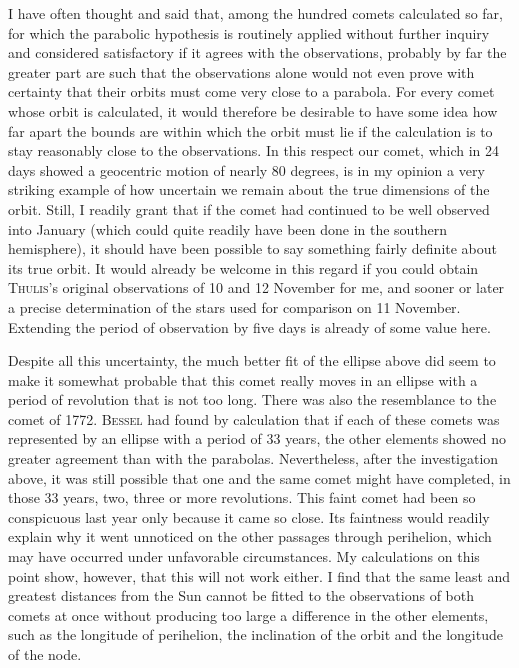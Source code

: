 \par\indent I have often thought and said that, among the hundred comets calculated so far, for which the parabolic hypothesis is routinely applied without further inquiry and considered satisfactory if it agrees with the observations, probably by far the greater part are such that the observations alone would not even prove with certainty that their orbits must come very close to a parabola. For every comet whose orbit is calculated, it would therefore be desirable to have some idea how far apart the bounds are within which the orbit must lie if the calculation is to stay reasonably close to the observations. In this respect our comet, which in 24 days showed a geocentric motion of nearly 80 degrees, is in my opinion a very striking example of how uncertain we remain about the true dimensions of the orbit. Still, I readily grant that if the comet had continued to be well observed into January (which could quite readily have been done in the southern hemisphere), it should have been possible to say something fairly definite about its true orbit. It would already be welcome in this regard if you could obtain \textsc{Thulis}’s original observations of 10 and 12 November for me, and sooner or later a precise determination of the stars used for comparison on 11 November. Extending the period of observation by five days is already of some value here.

\par\indent Despite all this uncertainty, the much better fit of the ellipse above did seem to make it somewhat probable that this comet really moves in an ellipse with a period of revolution that is not too long. There was also the resemblance to the comet of 1772. \textsc{Bessel} had found by calculation that if each of these comets was represented by an ellipse with a period of 33 years, the other elements showed no greater agreement than with the parabolas. Nevertheless, after the investigation above, it was still possible that one and the same comet might have completed, in those 33 years, two, three
%
or more revolutions. This faint comet had been so conspicuous last year only because it came so close. Its faintness would readily explain why it went unnoticed on the other passages through perihelion, which may have occurred under unfavorable circumstances. My calculations on this point show, however, that this will not work either. I find that the same least and greatest distances from the Sun cannot be fitted to the observations of both comets at once without producing too large a difference in the other elements, such as the longitude of perihelion, the inclination of the orbit and the longitude of the node.

